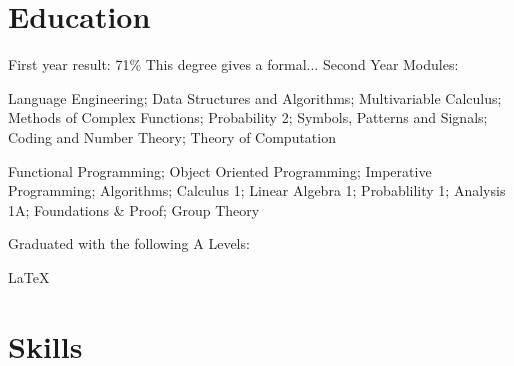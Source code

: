 \documentclass{cvclass}
\begin{document}
\address{Flat 7, 5-6 Clifton Down Road, Bristol, BS8 4AG}
\address{Email: sv17490@bristol.ac.uk, Mobile: 07908911995}
\address{Github: www.github.com/sollyvarcoe}
\section{Education}
\indent\indent First year result: 71\% \newline
\indent\indent This degree gives a formal...\newline
Second Year Modules:

  \begin{table}[h!]

     Language Engineering; Data Structures and Algorithms; Multivariable Calculus; Methods of Complex Functions;\newline
     Probability 2; Symbols, Patterns and Signals; Coding and Number Theory; Theory of Computation

  \end{table}


  \begin{table}[h!]

     Functional Programming; Object Oriented Programming; Imperative Programming; Algorithms; Calculus 1;\newline
      Linear Algebra 1; Probablility 1; Analysis 1A; Foundations \& Proof; Group Theory
  \end{table}

Graduated with the following A Levels: \newline
\hangindent=1cm

\LaTeX
\section{Skills}
\subsection{}
\end{document}

